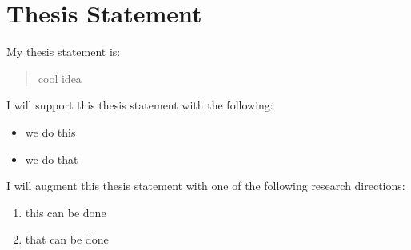 \section{Thesis Statement}

My thesis statement is:

\begin{quote}
  cool idea
\end{quote}

I will support this thesis statement with the following:

\begin{itemize}
  \item we do this
  \item we do that
\end{itemize}

I will augment this thesis statement with one of the following research directions:

\begin{enumerate}
  \item this can be done
  \item that can be done
\end{enumerate}
